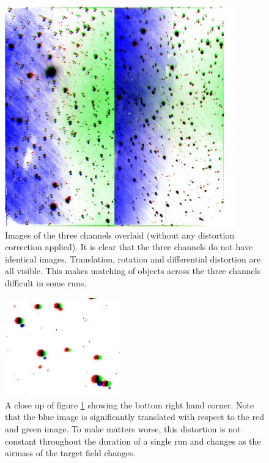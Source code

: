 \begin{figure}
  \centering
  \includegraphics[width=100mm]{images/overlay_multiply.png}
  \caption{Images of the three channels overlaid (without any distortion correction applied). It is clear that the three channels do not have identical images. Translation, rotation and differential distortion are all visible. This makes matching of objects across the three channels difficult in some runs. }
\label{fig:nonoverlap}
\end{figure}

\begin{figure}
  \centering
  \includegraphics[width=50mm]{images/overlay_multiply_closeup.png}
  \caption{A close up of figure \ref{fig:nonoverlap} showing the bottom right hand corner. Note that the blue image is significantly translated with respect to the red and green image. To make matters worse, this distortion is not constant throughout the duration of a single run and changes as the airmass of the target field changes.}
\label{fig:nonoverlapzoom}
\end{figure}

